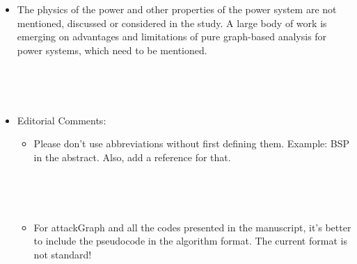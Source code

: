 \begin{itemize}
~


~

\item The physics of the power and other properties of the power system are not mentioned, discussed or considered in the study. A large body of work is emerging on advantages and limitations of pure graph-based analysis for power systems, which need to be mentioned. 

~


~

\item Editorial Comments:
\begin{itemize}
\item Please don't use abbreviations without first defining them. Example: BSP in the abstract. Also, add a reference for that.

~


~
\item For attackGraph and all the codes presented in the manuscript,  it's better to include the pseudocode in the algorithm format. The current format is not standard!

~


~
\end{itemize}
\end{itemize}



